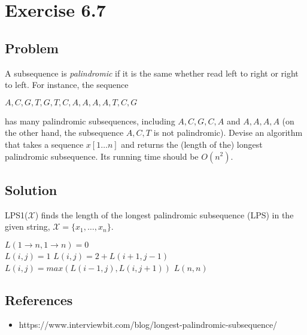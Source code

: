 \documentclass[12pt, letterpaper]{article}
\begin{document}
\section{Exercise 6.7}

\subsection{Problem}

A subsequence is \emph{palindromic} if it is the same whether read left to right or right to left. For instance, the sequence
\begin{center}
    \(A,C,G,T,G,T,C,A,A,A,A,T,C,G\)
\end{center}
has many palindromic subsequences, including \(A, C, G, C, A\) and \(A, A, A, A\) (on the other hand, the subsequence \(A, C, T\) is not palindromic). Devise an algorithm that takes a sequence \(x[1 \dots n]\) and returns the (length of the) longest palindromic subsequence. Its running time should be \(O(n^2)\).

\subsection{Solution}

\begin{algorithm}
    \caption{LPS1(\(\mathcal{X}\)) finds the length of the longest palindromic subsequence (LPS) in the given string, \(\mathcal{X} = \{x_1,\dots,x_n\}\).}
    \(L(1 \to n, 1 \to n) = 0\) \\
    {
        {
            {
                \(L(i,j) = 1\)
            }
            {
                \(L(i,j) = 2 + L(i+1,j-1)\)
            }
            \Else
            {
                \(L(i,j) = max(L(i-1,j), L(i, j+1))\)
            }
        }
    }
    \Return \(L(n,n)\)
\end{algorithm}

\subsection{References}

\begin{itemize}
    \item https://www.interviewbit.com/blog/longest-palindromic-subsequence/
\end{itemize}
\end{document}
